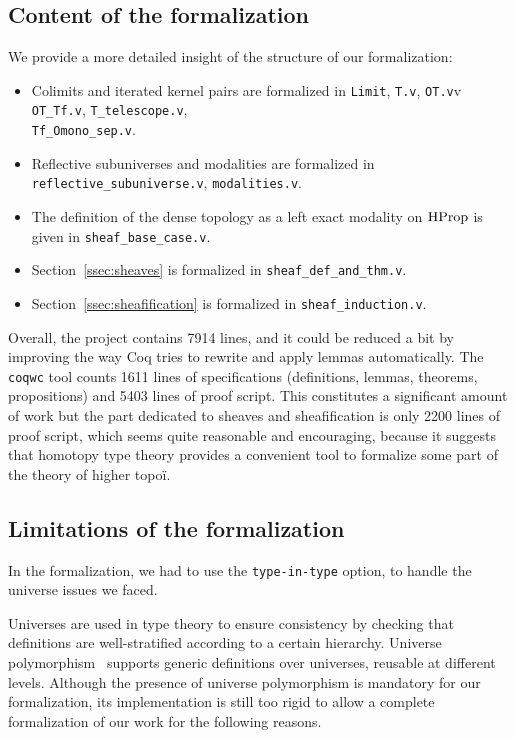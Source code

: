 \subsection{Content of the formalization}
\label{ssec:cont-form}

We provide a more detailed insight of the structure of our formalization:
\begin{itemize} 
\item Colimits and iterated kernel pairs are formalized in
\texttt{Limit}, \texttt{T.v}, \texttt{OT.v}v \texttt{OT\_Tf.v}, \texttt{T\_telescope.v},\\ \texttt{Tf\_Omono\_sep.v}.%
\item
Reflective subuniverses and modalities are formalized in\\
\texttt{reflective\_subuniverse.v}, \texttt{modalities.v}. %
\item 
%
  The definition of the dense topology as a left exact modality on
  $\operatorname{HProp}$ is given in \texttt{sheaf\_base\_case.v}. %
\item
Section~\ref{ssec:sheaves} is formalized in
\texttt{sheaf\_def\_and\_thm.v}. %
\item
Section~\ref{ssec:sheafification} is formalized in
\texttt{sheaf\_induction.v}. %
\end{itemize}

Overall, %
the project
contains 7914 lines, and it could be reduced a bit by improving the
way Coq tries to rewrite and apply lemmas automatically. 
The \texttt{coqwc} tool counts 1611 lines of specifications
(definitions, lemmas, theorems, propositions) and 5403 lines of proof
script.
%
This constitutes a significant amount of work but the part dedicated
to sheaves and sheafification is only 2200 lines of proof script,
which seems quite reasonable and encouraging, because it suggests
that homotopy type theory provides a convenient tool to formalize some
part of the theory of higher topoï. 

\subsection{Limitations of the formalization}
\label{ssec:limit-form}

In the formalization, we had to use the \texttt{type-in-type} option, to handle
the universe issues we faced.

Universes are used in type theory to ensure consistency by checking
that definitions are well-stratified according to a certain hierarchy.
%
Universe polymorphism~\cite{sozeau2014universe} supports generic
definitions over universes, reusable at different levels.
%
Although the presence of universe polymorphism is mandatory for our
formalization, its implementation is still too rigid to allow a
complete formalization of our work for the following reasons.

